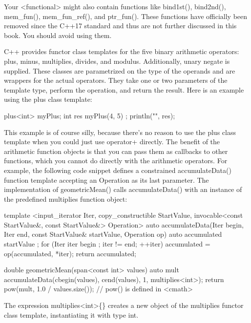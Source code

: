 Your <functional> might also contain functions like bind1st(), bind2nd(), mem\_fun(), mem\_fun\_ref(), and ptr\_fun(). These functions have officially been removed since the C++17 standard and thus are not further discussed in this book. You should avoid using them.


C++ provides functor class templates for the five binary arithmetic operators: plus, minus, multiplies, divides, and modulus. Additionally, unary negate is supplied. These classes are parametrized on the type of the operands and are wrappers for the actual operators. They take one or two parameters of the template type, perform the operation, and return the result. Here is an example using the plus class template:

\begin{cpp}
plus<int> myPlus;
int res { myPlus(4, 5) };
println("{}", res);
\end{cpp}

This example is of course silly, because there’s no reason to use the plus class template when you could just use operator+ directly. The benefit of the arithmetic function objects is that you can pass them as callbacks to other functions, which you cannot do directly with the arithmetic operators. For example, the following code snippet defines a constrained accumulateData() function template accepting an Operation as its last parameter. The implementation of geometricMean() calls accumulateData() with an instance of the predefined multiplies function object:

\begin{cpp}
template <input_iterator Iter, copy_constructible StartValue,
          invocable<const StartValue&, const StartValue&> Operation>
auto accumulateData(Iter begin, Iter end,
    const StartValue& startValue, Operation op)
{
    auto accumulated { startValue };
    for (Iter iter { begin }; iter != end; ++iter) {
        accumulated = op(accumulated, *iter);
    }
    return accumulated;
}

double geometricMean(span<const int> values)
{
    auto mult {accumulateData(cbegin(values), cend(values), 1, multiplies<int>{})};
    return pow(mult, 1.0 / values.size()); // pow() is defined in <cmath>
}
\end{cpp}

The expression multiplies<int>\{\} creates a new object of the multiplies functor class template, instantiating it with type int.

